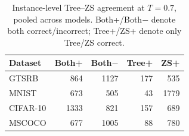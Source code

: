 \begin{table}[t]
\centering
\caption{Instance-level Tree--ZS agreement at $T=0.7$, pooled across models. Both+/Both$-$ denote both correct/incorrect; Tree+/ZS+ denote only Tree/ZS correct.}
\label{tab:agreement}
\footnotesize
\begin{tabular}{@{}lrrrr@{}}
\toprule
\textbf{Dataset} & \textbf{Both+} & \textbf{Both$-$} & \textbf{Tree+} & \textbf{ZS+} \\
\midrule
GTSRB & 864 & 1127 & 177 & 535 \\
MNIST & 673 & 505 & 43 & 1779 \\
CIFAR-10 & 1333 & 821 & 157 & 689 \\
MSCOCO & 677 & 1005 & 88 & 780 \\
\bottomrule
\end{tabular}
\end{table}
